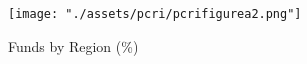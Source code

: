 
\begin{figure}[tb]
    \centering
\texttt{[image: "./assets/pcri/pcrifigurea2.png"]}
\caption{Funds by Region (\%)\label{fig:pcrifigurea2}}
\end{figure}